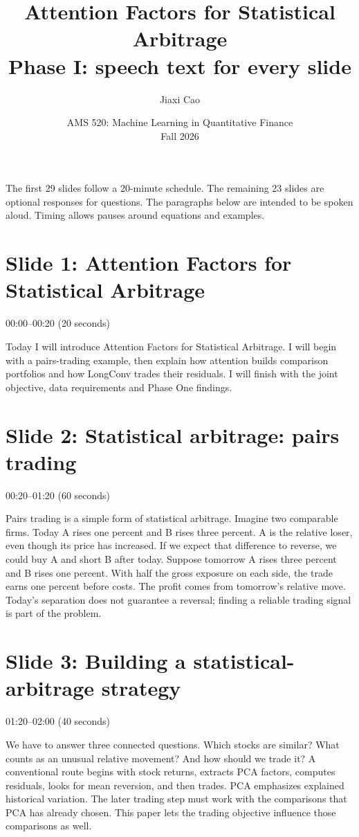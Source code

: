 \documentclass[11pt]{article}
\title{\textcolor{SBred}{Attention Factors for Statistical Arbitrage}\\\large Phase I: speech text for every slide}
\author{Jiaxi Cao}
\date{AMS 520: Machine Learning in Quantitative Finance\\Fall 2026}
\begin{document}
\maketitle
The first 29 slides follow a 20-minute schedule. The remaining 23 slides are optional responses for questions. The paragraphs below are intended to be spoken aloud. Timing allows pauses around equations and examples.


\section*{Slide 1: Attention Factors for Statistical Arbitrage}

\textcolor{SBred}{00:00--00:20 (20 seconds)}

Today I will introduce Attention Factors for Statistical Arbitrage. I will begin with a pairs-trading example, then explain how attention builds comparison portfolios and how LongConv trades their residuals. I will finish with the joint objective, data requirements and Phase One findings.

\section*{Slide 2: Statistical arbitrage: pairs trading}

\textcolor{SBred}{00:20--01:20 (60 seconds)}

Pairs trading is a simple form of statistical arbitrage. Imagine two comparable firms. Today A rises one percent and B rises three percent. A is the relative loser, even though its price has increased. If we expect that difference to reverse, we could buy A and short B after today. Suppose tomorrow A rises three percent and B rises one percent. With half the gross exposure on each side, the trade earns one percent before costs. The profit comes from tomorrow's relative move. Today's separation does not guarantee a reversal; finding a reliable trading signal is part of the problem.

\section*{Slide 3: Building a statistical-arbitrage strategy}

\textcolor{SBred}{01:20--02:00 (40 seconds)}

We have to answer three connected questions. Which stocks are similar? What counts as an unusual relative movement? And how should we trade it? A conventional route begins with stock returns, extracts PCA factors, computes residuals, looks for mean reversion, and then trades. PCA emphasizes explained historical variation. The later trading step must work with the comparisons that PCA has already chosen. This paper lets the trading objective influence those comparisons as well.
\end{document}
